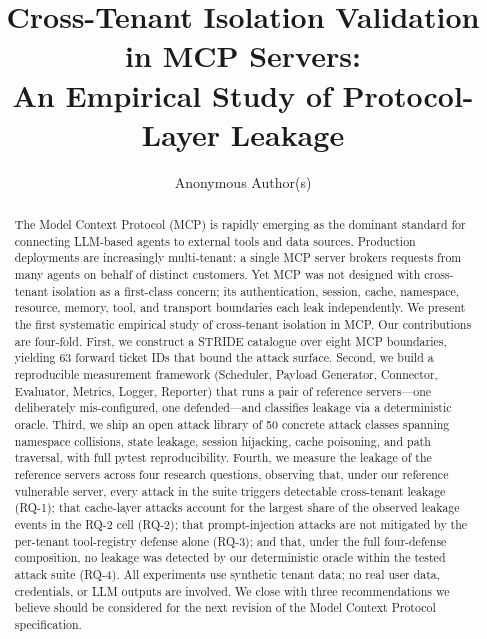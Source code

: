 \documentclass[sigconf, anonymous, natbib=false]{acmart}
\begin{document}
\title[Cross-Tenant Isolation Validation]{Cross-Tenant Isolation Validation in MCP Servers:\\%
       An Empirical Study of Protocol-Layer Leakage}

\author{Anonymous Author(s)}

\begin{abstract}
The Model Context Protocol (MCP) is rapidly emerging as the
dominant standard for connecting LLM-based agents to external
tools and data sources. Production deployments are
increasingly multi-tenant: a single MCP server brokers
requests from many agents on behalf of distinct customers.
Yet MCP was not designed with cross-tenant isolation as a
first-class concern; its authentication, session, cache,
namespace, resource, memory, tool, and transport boundaries
each leak independently. We present the first systematic
empirical study of cross-tenant isolation in MCP. Our
contributions are four-fold. First, we construct a STRIDE
catalogue over eight MCP boundaries, yielding 63 forward
ticket IDs that bound the attack surface. Second, we build a
reproducible measurement framework (Scheduler, Payload
Generator, Connector, Evaluator, Metrics, Logger, Reporter)
that runs a pair of reference servers---one deliberately
mis-configured, one defended---and classifies leakage via a
deterministic oracle. Third, we ship an open attack library
of 50 concrete attack classes spanning namespace collisions,
state leakage, session hijacking, cache poisoning, and path
traversal, with full pytest reproducibility. Fourth, we
measure the leakage of the reference servers across four
research questions, observing that, under our reference
vulnerable server, every attack in the suite triggers
detectable cross-tenant leakage (RQ-1); that cache-layer
attacks account for the largest share of the observed
leakage events in the RQ-2 cell (RQ-2); that prompt-injection
attacks are not mitigated by the per-tenant tool-registry
defense alone (RQ-3); and that, under the full four-defense
composition, no leakage was detected by our deterministic
oracle within the tested attack suite (RQ-4). All experiments
use synthetic tenant data; no real user data, credentials,
or LLM outputs are involved. We close with three
recommendations we believe should be considered for the
next revision of the Model Context Protocol
specification.
\end{abstract}
\end{document}
